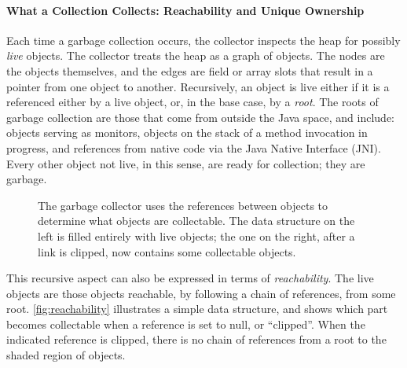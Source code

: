 \paragraph{What a Collection Collects: Reachability and Unique Ownership}
Each time a garbage collection occurs, the collector inspects the heap for
possibly \emph{live} objects. The collector treats the heap as a graph of
objects. The nodes are the objects themselves, and the edges are field or array
slots that result in a pointer from one object to another.  Recursively, an object is live either if it is a referenced
either by a live object, or, in the base case, by a \emph{root}. The roots of
garbage collection are those that come from outside the Java space, and include:
objects serving as monitors, objects on the stack of a method invocation in
progress, and references from native code via the Java Native Interface (JNI).
Every other object not live, in this sense, are ready for collection; they are
garbage.

\begin{figure}
\centering
	\hspace{0.18\textwidth}
	\caption{The garbage collector uses the references between objects to
	determine what objects are collectable. The data structure on the left is
	filled entirely with live objects; the one on the right, after a link is
	clipped, now contains some collectable objects.}
	\label{fig:reachability}
\end{figure}

This recursive aspect can also be expressed in terms of \emph{reachability}.
 The live objects are those objects reachable, by following a
chain of references, from some root. \autoref{fig:reachability} illustrates a
simple data structure, and shows which part becomes collectable when a reference
is set to null, or ``clipped''. When the indicated reference is clipped, there is
no chain of references from a root to the shaded region of objects.

